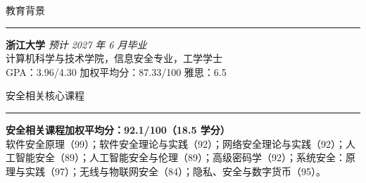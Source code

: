 \documentclass{resume} %
\renewenvironment{rSection}[1]{
\sectionskip
\textcolor{CarnegieMellonRed}{\MakeUppercase{#1}}
\sectionlineskip
\hrule
\begin{list}{}{\setlength{\leftmargin}{1.5em}}
\item[]
}{\end{list}}
\begin{document}
\begin{rSection}{教育背景}
\textbf{浙江大学} \hfill \textit{预计 2027 年 6 月毕业}\\
计算机科学与技术学院，信息安全专业，工学学士\\
GPA：3.96/4.30 \quad 加权平均分：87.33/100 \quad 雅思：6.5
\end{rSection}

\begin{rSection}{安全相关核心课程}
\textbf{安全相关课程加权平均分：92.1/100（18.5 学分）}\\
\small 软件安全原理（99）；软件安全理论与实践（92）；网络安全理论与实践（92）；人工智能安全（89）；人工智能安全与伦理（89）；高级密码学（92）；系统安全：原理与实践（97）；无线与物联网安全（84）；隐私、安全与数字货币（95）。\normalsize
\end{rSection}
\end{document}
